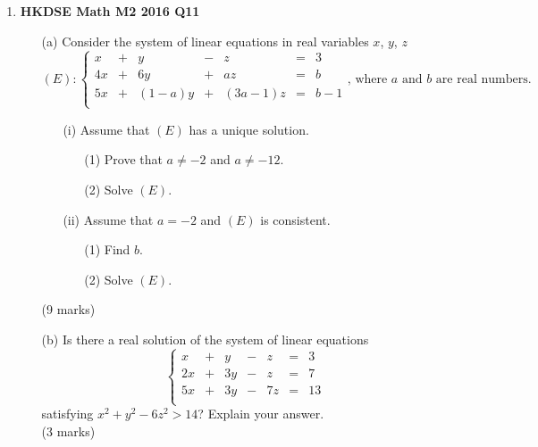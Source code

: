 \documentclass[12pt]{article}
\begin{document}
\begin{enumerate}
	\item \textbf{HKDSE Math M2 2016 Q11}
	\begin{enumerate}
		\item [(a)]Consider the system of linear equations in real variables $x$, $y$, $z$
		$$(E) : \left\{\begin{matrix}
		x &+&     y&-&      z&=&3  \\
		4x&+&    6y&+&     az&=&b  \\
		5x&+&(1-a)y&+&(3a-1)z&=&b-1\\
		\end{matrix}\right.\text{, where } a\text{ and } b\text{ are real numbers.}$$
		\begin{enumerate}
			\item [(i)]Assume that $(E)$ has a unique solution.
			\begin{enumerate}
				\item [(1)]Prove that $a\neq -2$ and $a \neq -12$.
				\item [(2)]Solve $(E)$. 
			\end{enumerate}
			\item [(ii)]Assume that $a = -2$ and $(E)$ is consistent.
			\begin{enumerate}
				\item [(1)]Find $b$. 
				\item [(2)]Solve $(E)$.
			\end{enumerate}
		\end{enumerate}
		(9 marks)
		\item [(b)] Is there a real solution of the system of linear equations
		$$\left\{\begin{matrix}
		x&+&y&-&z&=&3\\
		2x&+&3y&-&z&=&7\\
		5x&+&3y&-&7z&=&13\\
		\end{matrix}\right.$$
		satisfying $x^2+y^2-6z^2 > 14$? Explain your answer. \\(3 marks)
	\end{enumerate}


\end{enumerate}
\end{document}

